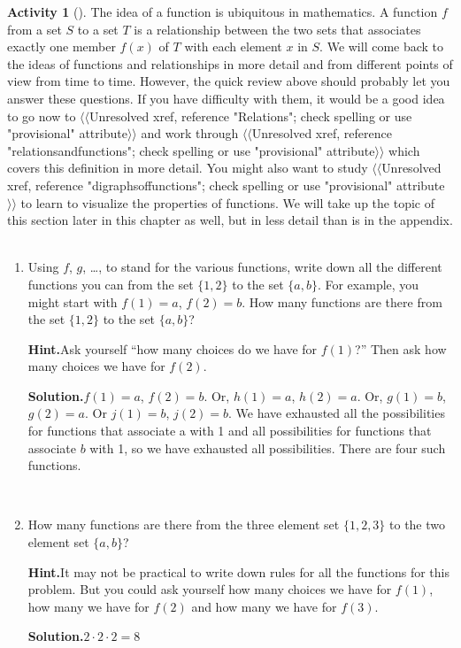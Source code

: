 \documentclass[10pt,]{book}
\theoremstyle{plain}
\theoremstyle{definition}
\newtheorem{activity}[project]{Activity}
\numberwithin{equation}{chapter}
\begin{document}
\begin{activity}[]\label{countingfunctions}
The idea of a function is ubiquitous in mathematics. A function \(f\) from a set \(S\) to a set \(T\) is a relationship between the two sets that associates exactly one member \(f(x)\) of \(T\) with each element \(x\) in \(S\). We will come back to the ideas of functions and relationships in more detail and from different points of view from time to time. However, the quick review above should probably let you answer these questions. If you have difficulty with them, it would be a good idea to go now to {$\langle\langle$Unresolved xref, reference "Relations"; check spelling or use "provisional" attribute$\rangle\rangle$} and work through {$\langle\langle$Unresolved xref, reference "relationsandfunctions"; check spelling or use "provisional" attribute$\rangle\rangle$} which covers this definition in more detail. You might also want to study {$\langle\langle$Unresolved xref, reference "digraphsoffunctions"; check spelling or use "provisional" attribute$\rangle\rangle$} to learn to visualize the properties of functions. We will take up the topic of this section later in this chapter as well, but in less detail than is in the appendix.%
~\par
\begin{enumerate}[label=(\alph*)]
 \item Using \(f\), \(g\), \dots{}, to stand for the various functions, write down all the different functions you can from the set \(\{1,2\}\) to the set \(\{a,b\}\).  For example, you might start with \(f(1)=a\), \(f(2)=b\).  How many functions are there from the set \(\{1,2\}\) to the set \(\{a,b\}\)?%
\par\medskip\noindent%
\textbf{Hint.}\quad Ask yourself “how many choices do we have for \(f(1)\)?” Then ask how many choices we have for \(f(2)\).%
\par\medskip\noindent%
\textbf{Solution.}\quad \(f(1) =a\), \(f(2) = b\). Or, \(h(1) =a\), \(h(2) =a\). Or, \(g(1)=b\), \(g(2) = a\). Or \(j(1) =b\), \(j(2) =b\). We have exhausted all the possibilities for functions that associate a with 1 and all possibilities for functions that associate \(b\) with 1, so we have exhausted all possibilities. There are four such functions.%

~\par
\item How many functions are there from the three element set \(\{1,2,3\}\) to the two element set \(\{a,b\}\)?%
\par\medskip\noindent%
\textbf{Hint.}\quad It may not be practical to write down rules for all the functions for this problem. But you could ask yourself how many choices we have for \(f(1)\), how many we have for \(f(2)\) and how many we have for \(f(3)\).%
\par\medskip\noindent%
\textbf{Solution.}\quad \(2\cdot2\cdot2 = 8\)%


\end{enumerate}
\end{activity}
\end{document}
